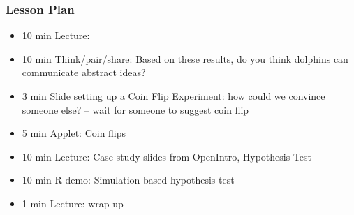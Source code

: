 \begin{frame}
    \frametitle{Lesson Plan}
    \begin{itemize}
        \item 10 min Lecture: 
        \item 10 min Think/pair/share: Based on these results, do you think dolphins can communicate abstract ideas?
        \item 3 min Slide setting up a Coin Flip Experiment: how could we convince someone else? -- wait for someone to suggest coin flip
        \item 5 min Applet: Coin flips
        \item 10 min Lecture: Case study slides from OpenIntro, Hypothesis Test
        \item 10 min R demo: Simulation-based hypothesis test
        \item 1 min Lecture: wrap up
    \end{itemize}
\end{frame}



